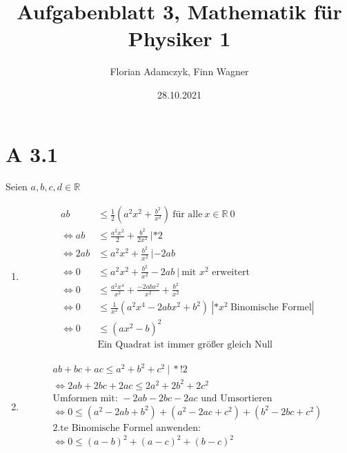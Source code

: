 \documentclass{article}
\date{28.10.2021}
\title{Aufgabenblatt 3, Mathematik für Physiker 1}
\author{Florian Adamczyk, Finn Wagner}
\begin{document}
    \maketitle
    
    \section*{A 3.1}
       Seien \(a, b, c, d \in \mathbb{R}\)
       \begin{enumerate}[label = (\alph*)]
            \item 
                \begin{align*}
                    ab & \leq \frac{1}{2} (a^2 x^2 + \frac{b^2}{x^2}) \: \text{für alle} \: x \in \mathbb{R} \ {0} \\
                    \Leftrightarrow ab & \leq \frac{a^2 x^2}{2} + \frac{b^2}{2x^2} \: | * 2 \\
                    \Leftrightarrow 2ab & \leq a^2 x^2 + \frac{b^2}{x^2} \: | -2ab \\
                    \Leftrightarrow 0 & \leq a^2 x^2 + \frac{b^2}{x^2} - 2ab \: | \: \text{mit } x^2 \text{ erweitert} \\ 
                    \Leftrightarrow 0 & \leq \frac{a^2 x^4}{x^2} + \frac{-2abx^2}{x^2} + \frac{b^2}{x^2} \\
                    \Leftrightarrow 0 & \leq \frac{1}{x^2} (a^2 x^4  - 2abx^2 + b^2) \: | * x^2 \: \text{Binomische Formel} | \\
                    \Leftrightarrow 0 & \leq {(ax^2 - b)}^2 \\
                    & \text{Ein Quadrat ist immer größer gleich Null}
                \end{align*}
            \item 
                \begin{gather*}
                    ab + bc + ac \leq a^2 + b^2 + c^2 \: | \: *!2\\
                    \Leftrightarrow 2ab + 2bc + 2ac \leq 2a^2 + 2b^2 + 2c^2 \\
                    \text{Umformen mit: } -2ab -2bc -2ac \text{ und Umsortieren}\\
                    \Leftrightarrow 0 \leq (a^2 -2ab + b^2) + (a^2 -2ac + c^2) + (b^2 -2bc + c^2) \\
                    \text{2.te Binomische Formel anwenden:} \\
                    \Leftrightarrow 0 \leq {(a - b)}^2 + {(a - c)}^2 + {(b - c)}^2 \\

\end{gather*}
\end{enumerate}
\end{document}
